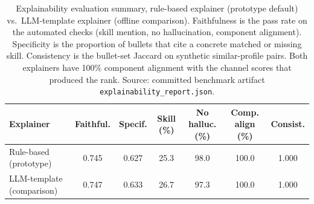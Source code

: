 \begin{table}[!t]
\centering
\caption{Explainability evaluation summary, rule-based explainer (prototype default) vs.\ LLM-template explainer (offline comparison). Faithfulness is the pass rate on the automated checks (skill mention, no hallucination, component alignment). Specificity is the proportion of bullets that cite a concrete matched or missing skill. Consistency is the bullet-set Jaccard on synthetic similar-profile pairs. Both explainers have 100\% component alignment with the channel scores that produced the rank. Source: committed benchmark artifact \texttt{explainability\_report.json}.}
\label{tab:explainability}
\footnotesize
\setlength{\tabcolsep}{3pt}
\begin{tabular*}{\textwidth}{@{\extracolsep{\fill}}lcccccc@{}}
\toprule
Explainer & Faithful. & Specif. & Skill (\%) & No halluc. (\%) & Comp. align (\%) & Consist. \\
\midrule
Rule-based (prototype)   & 0.745 & 0.627 & 25.3 & 98.0 & 100.0 & 1.000 \\
LLM-template (comparison) & 0.747 & 0.633 & 26.7 & 97.3 & 100.0 & 1.000 \\
\bottomrule
\end{tabular*}
\end{table}

